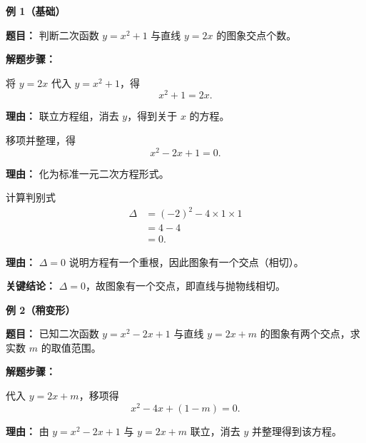 \begin{examplebox}
	\textbf{\textcolor{CExample}{例 1（基础）}}

	\textbf{\textcolor{CExample}{题目：}} 判断二次函数 $y=x^{2}+1$ 与直线 $y=2x$ 的图象交点个数。

	\textbf{\textcolor{CExample}{解题步骤：}}
	\begin{description}[style=nextline, leftmargin=2.8em, labelsep=0.5em, itemsep=0.45em]
		\item[\textbf{第一步（代入联立）：}]
		      将 $y=2x$ 代入 $y=x^{2}+1$，得
		      \[
			      x^{2}+1=2x.
		      \]
		      \par\textbf{理由：} 联立方程组，消去 $y$，得到关于 $x$ 的方程。

		\item[\textbf{第二步（移项化简）：}]
		      移项并整理，得
		      \[
			      x^{2}-2x+1=0.
		      \]
		      \par\textbf{理由：} 化为标准一元二次方程形式。

		\item[\textbf{第三步（计算判别式）：}]
		      计算判别式
		      \[
			      \begin{aligned}
				      \Delta & =(-2)^{2}-4\times1\times1 \\
				             & =4-4                      \\
				             & =0.
			      \end{aligned}
		      \]
		      \par\textbf{理由：} $\Delta=0$ 说明方程有一个重根，因此图象有一个交点（相切）。
	\end{description}

	\textbf{\textcolor{CExample}{关键结论：}} $\Delta=0$，故图象有一个交点，即直线与抛物线相切。

	\medskip
	\textbf{\textcolor{CExample}{例 2（稍变形）}}

	\textbf{\textcolor{CExample}{题目：}} 已知二次函数 $y=x^{2}-2x+1$ 与直线 $y=2x+m$ 的图象有两个交点，求实数 $m$ 的取值范围。

	\textbf{\textcolor{CExample}{解题步骤：}}
	\begin{description}[style=nextline, leftmargin=2.8em, labelsep=0.5em, itemsep=0.45em]
		\item[\textbf{第一步（联立整理）：}]
		      代入 $y=2x+m$，移项得
		      \[
			      x^{2}-4x+(1-m)=0.
		      \]
		      \par\textbf{理由：} 由 $y=x^{2}-2x+1$ 与 $y=2x+m$ 联立，消去 $y$ 并整理得到该方程。


\end{description}
\end{examplebox}
